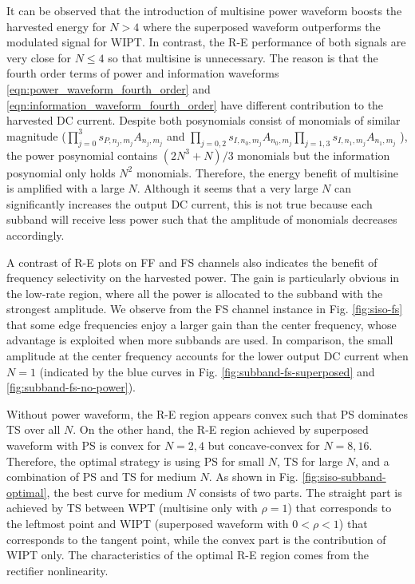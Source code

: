 It can be observed that the introduction of multisine power waveform boosts the harvested energy for $N > 4$ where the superposed waveform outperforms the modulated signal for WIPT. In contrast, the R-E performance of both signals are very close for $N \leqslant 4$ so that multisine is unnecessary. The reason is that the fourth order terms of power and information waveforms \eqref{eqn:power_waveform_fourth_order} and \eqref{eqn:information_waveform_fourth_order} have different contribution to the harvested DC current. Despite both posynomials consist of monomials of similar magnitude (${\prod\nolimits_{j = 0}^3 {{s_{P,{n_j},{m_j}}}{A_{{n_j},{m_j}}}} }$ and $\prod\nolimits_{j = 0,2} {{s_{I,{n_0},{m_j}}}{A_{{n_0},{m_j}}}} \prod\nolimits_{j = 1,3} {{s_{I,{n_1},{m_j}}}{A_{{n_1},{m_j}}}} $ ), the power posynomial contains $(2{N^3} + N)/3$ monomials but the information posynomial only holds ${N^2}$ monomials. Therefore, the energy benefit of multisine is amplified with a large $N$. Although it seems that a very large $N$ can significantly increases the output DC current, this is not true because each subband will receive less power such that the amplitude of monomials decreases accordingly.

A contrast of R-E plots on FF and FS channels also indicates the benefit of frequency selectivity on the harvested power. The gain is particularly obvious in the low-rate region, where all the power is allocated to the subband with the strongest amplitude. We observe from the FS channel instance in Fig. \ref{fig:siso-fs} that some edge frequencies enjoy a larger gain than the center frequency, whose advantage is exploited when more subbands are used. In comparison, the small amplitude at the center frequency accounts for the lower output DC current when $N = 1$ (indicated by the blue curves in Fig. \ref{fig:subband-fs-superposed} and \ref{fig:subband-fs-no-power}).

Without power waveform, the R-E region appears convex such that PS dominates TS over all $N$. On the other hand, the R-E region achieved by superposed waveform with PS is convex for $N = 2,4$ but concave-convex for $N = 8,16$. Therefore, the optimal strategy is using PS for small $N$, TS for large $N$, and a combination of PS and TS for medium $N$. As shown in Fig. \ref{fig:siso-subband-optimal}, the best curve for medium $N$ consists of two parts. The straight part is achieved by TS between WPT (multisine only with $\rho  = 1$) that corresponds to the leftmost point and WIPT (superposed waveform with $0 < \rho  < 1$) that corresponds to the tangent point, while the convex part is the contribution of WIPT only. The characteristics of the optimal R-E region comes from the rectifier nonlinearity.

